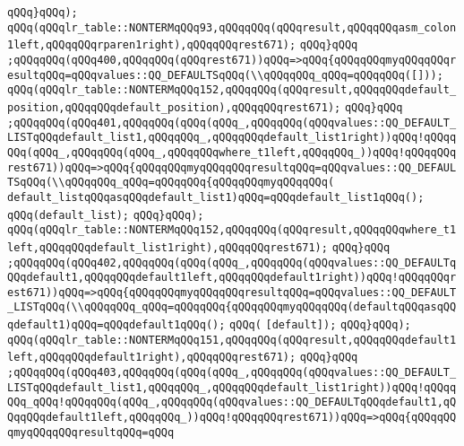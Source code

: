 \verb|qQQq}qQQq);|\newline
\verb|qQQq(qQQqlr_table::NONTERMqQQq93,qQQqqQQq(qQQqresult,qQQqqQQqasm_colon1left,qQQqqQQqrparen1right),qQQqqQQqrest671);|\newline
\verb|qQQq}qQQq|\newline
\verb|;qQQqqQQq(qQQq400,qQQqqQQq(qQQqrest671))qQQq=>qQQq{qQQqqQQqmyqQQqqQQqresultqQQq=qQQqvalues::QQ_DEFAULTSqQQq(\\qQQqqQQq_qQQq=qQQqqQQq([]));|\newline
\verb|qQQq(qQQqlr_table::NONTERMqQQq152,qQQqqQQq(qQQqresult,qQQqqQQqdefault_position,qQQqqQQqdefault_position),qQQqqQQqrest671);|\newline
\verb|qQQq}qQQq|\newline
\verb|;qQQqqQQq(qQQq401,qQQqqQQq(qQQq(qQQq_,qQQqqQQq(qQQqvalues::QQ_DEFAULT_LISTqQQqdefault_list1,qQQqqQQq_,qQQqqQQqdefault_list1right))qQQq!qQQqqQQq(qQQq_,qQQqqQQq(qQQq_,qQQqqQQqwhere_t1left,qQQqqQQq_))qQQq!qQQqqQQqrest671))qQQq=>qQQq{qQQqqQQqmyqQQqqQQqresultqQQq=qQQqvalues::QQ_DEFAULTSqQQq(\\qQQqqQQq_qQQq=qQQqqQQq{qQQqqQQqmyqQQqqQQq(|\newline
\verb|default_listqQQqasqQQqdefault_list1)qQQq=qQQqdefault_list1qQQq();|\newline
\verb|qQQq(default_list);|\newline
\verb|qQQq}qQQq);|\newline
\verb|qQQq(qQQqlr_table::NONTERMqQQq152,qQQqqQQq(qQQqresult,qQQqqQQqwhere_t1left,qQQqqQQqdefault_list1right),qQQqqQQqrest671);|\newline
\verb|qQQq}qQQq|\newline
\verb|;qQQqqQQq(qQQq402,qQQqqQQq(qQQq(qQQq_,qQQqqQQq(qQQqvalues::QQ_DEFAULTqQQqdefault1,qQQqqQQqdefault1left,qQQqqQQqdefault1right))qQQq!qQQqqQQqrest671))qQQq=>qQQq{qQQqqQQqmyqQQqqQQqresultqQQq=qQQqvalues::QQ_DEFAULT_LISTqQQq(\\qQQqqQQq_qQQq=qQQqqQQq{qQQqqQQqmyqQQqqQQq(defaultqQQqasqQQqdefault1)qQQq=qQQqdefault1qQQq();|\newline
\verb|qQQq(|\newline
\verb|[default]);|\newline
\verb|qQQq}qQQq);|\newline
\verb|qQQq(qQQqlr_table::NONTERMqQQq151,qQQqqQQq(qQQqresult,qQQqqQQqdefault1left,qQQqqQQqdefault1right),qQQqqQQqrest671);|\newline
\verb|qQQq}qQQq|\newline
\verb|;qQQqqQQq(qQQq403,qQQqqQQq(qQQq(qQQq_,qQQqqQQq(qQQqvalues::QQ_DEFAULT_LISTqQQqdefault_list1,qQQqqQQq_,qQQqqQQqdefault_list1right))qQQq!qQQqqQQq_qQQq!qQQqqQQq(qQQq_,qQQqqQQq(qQQqvalues::QQ_DEFAULTqQQqdefault1,qQQqqQQqdefault1left,qQQqqQQq_))qQQq!qQQqqQQqrest671))qQQq=>qQQq{qQQqqQQqmyqQQqqQQqresultqQQq=qQQq|\newline

